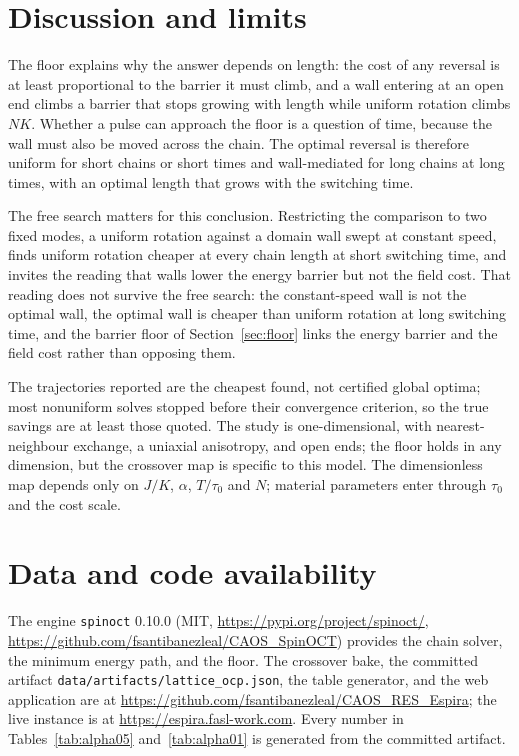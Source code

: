 \documentclass[11pt]{article}
\begin{document}
\section{Discussion and limits}

The floor explains why the answer depends on length: the cost of any reversal is at least proportional
to the barrier it must climb, and a wall entering at an open end climbs a barrier that stops growing
with length while uniform rotation climbs $NK$. Whether a pulse can approach the floor is a question
of time, because the wall must also be moved across the chain. The optimal reversal is therefore
uniform for short chains or short times and wall-mediated for long chains at long times, with an
optimal length that grows with the switching time.

The free search matters for this conclusion. Restricting the comparison to two fixed modes, a uniform
rotation against a domain wall swept at constant speed, finds uniform rotation cheaper at every chain
length at short switching time, and invites the reading that walls lower the energy barrier but not
the field cost. That reading does not survive the free search: the constant-speed wall is not the
optimal wall, the optimal wall is cheaper than uniform rotation at long switching time, and the
barrier floor of Section~\ref{sec:floor} links the energy barrier and the field cost rather than
opposing them.

The trajectories reported are the cheapest found, not certified global optima; most nonuniform solves
stopped before their convergence criterion, so the true savings are at least those quoted. The study is
one-dimensional, with nearest-neighbour exchange, a uniaxial anisotropy, and open ends; the floor holds
in any dimension, but the crossover map is specific to this model. The dimensionless map depends only on
$J/K$, $\alpha$, $T/\tau_0$ and $N$; material parameters enter through $\tau_0$ and the cost scale.

\section*{Data and code availability}

The engine \texttt{spinoct} 0.10.0 (MIT, \url{https://pypi.org/project/spinoct/},
\url{https://github.com/fsantibanezleal/CAOS_SpinOCT}) provides the chain solver, the minimum energy path,
and the floor. The crossover bake, the committed artifact \texttt{data/artifacts/lattice\_ocp.json}, the
table generator, and the web application are at
\url{https://github.com/fsantibanezleal/CAOS_RES_Espira}; the live instance is at
\url{https://espira.fasl-work.com}. Every number in Tables~\ref{tab:alpha05} and~\ref{tab:alpha01} is
generated from the committed artifact.
\end{document}
